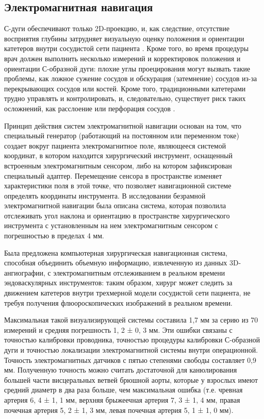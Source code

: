 \subsection{Электромагнитная навигация}

С-дуги обеспечивают только 2D-проекцию, и, как следствие, отсутствие
восприятия глубины затрудняет визуальную оценку положения и ориентации
катетеров внутри сосудистой сети пациента \cite{litlink26}. Кроме того, во время процедуры врач должен выполнить несколько измерений и корректировок положения и ориентации С-образной дуги: плохие углы проецирования могут вызвать такие проблемы, как ложное сужение сосудов и обскурация (затемнение) сосудов из-за перекрывающих сосудов или костей. Кроме того, традиционными катетерами трудно управлять и контролировать, и, следовательно, существует риск таких осложнений, как расслоение или перфорация сосудов \cite{litlink26}.

Принцип действия систем электромагнитной навигации основан на том,
что специальный генератор (работающий на постоянном или переменном токе) создает вокруг пациента электромагнитное поле, являющееся системой координат, в котором находится хирургический инструмент, оснащенный встроенным электромагнитным сенсором, либо на котором зафиксирован специальный адаптер. Перемещение сенсора в пространстве изменяет характеристики поля в этой точке, что позволяет навигационной системе определять координаты инструмента. В исследовании \cite{litlink26} безрамной электромагнитной навигации была описана система, которая позволила отслеживать угол наклона и ориентацию в пространстве хирургического инструмента с установленным на нем электромагнитным сенсором с погрешностью в пределах 4 мм.

Была предложена компьютерная хирургическая навигационная система, способная объединить объемную информацию, извлеченную из данных 3D-ангиографии, с электромагнитным отслеживанием в реальном времени эндоваскулярных инструментов: таким образом, хирург может следить за движением катетеров внутри трехмерной модели сосудистой сети пациента, не требуя получения флюороскопических изображений в реальном времени.

Максимальная такой визуализирующей системы составила 1,7 мм за серию из 70 измерений и средняя погрешность 1, 2 ± 0, 3 мм. Эти ошибки связаны с точностью калибровки проводника, точностью процедуры калибровки С-образной дуги и точностью локализации электромагнитной системы внутри операционной. Точность электромагнитных датчиков с пятью степенями свободы составляет 0,9 мм. Полученную точность можно считать достаточной для канюлирования большей части висцеральных ветвей брюшной аорты, которые у взрослых имеют средний диаметр в два раза больше, чем максимальная ошибка (т.е. чревная артерия 6, 4 ± 1, 1 мм, верхняя брыжеечная артерия 7, 3 ± 1, 4 мм, правая почечная артерия 5, 2 ± 1, 3 мм, левая почечная артерия 5, 1 ± 1, 0 мм).

